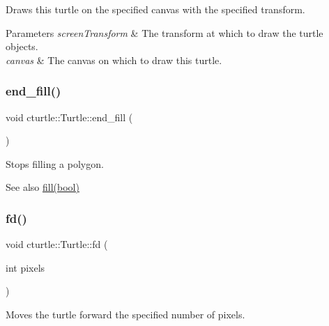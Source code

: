 Draws this turtle on the specified canvas with the specified transform. 


\begin{DoxyParams}{Parameters}
{\em screen\+Transform} & The transform at which to draw the turtle objects. \\
\hline
{\em canvas} & The canvas on which to draw this turtle. \\
\hline
\end{DoxyParams}
\mbox{\label{classcturtle_1_1Turtle_aaf0576f0492ba3c4b1afa5bea50b9ddb}} 
\subsubsection{\texorpdfstring{end\+\_\+fill()}{end\_fill()}}
{\footnotesize\ttfamily void cturtle\+::\+Turtle\+::end\+\_\+fill (\begin{DoxyParamCaption}{ }\end{DoxyParamCaption})\hspace{0.3cm}{\ttfamily [inline]}}



Stops filling a polygon. 

\begin{DoxySeeAlso}{See also}
\hyperlink{classcturtle_1_1Turtle_a7026fc9ad563b91b5a7a168718e91d6f}{fill(bool)} 
\end{DoxySeeAlso}
\mbox{\label{classcturtle_1_1Turtle_a2a9fa6b316c96af547eb90b44fbacdc0}} 
\subsubsection{\texorpdfstring{fd()}{fd()}}
{\footnotesize\ttfamily void cturtle\+::\+Turtle\+::fd (\begin{DoxyParamCaption}\item[{int}]{pixels }\end{DoxyParamCaption})\hspace{0.3cm}{\ttfamily [inline]}}



Moves the turtle forward the specified number of pixels. 

\mbox{\label{classcturtle_1_1Turtle_a7026fc9ad563b91b5a7a168718e91d6f}} 
